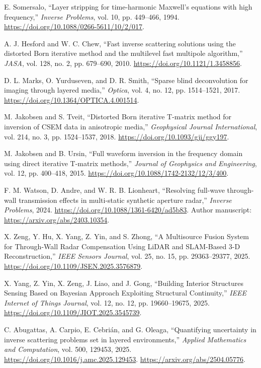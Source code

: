  E. Somersalo, ``Layer stripping for time-harmonic Maxwell's equations with high frequency,'' \emph{Inverse Problems}, vol. 10, pp. 449--466, 1994. \url{https://doi.org/10.1088/0266-5611/10/2/017}.

 A. J. Hesford and W. C. Chew, ``Fast inverse scattering solutions using the distorted Born iterative method and the multilevel fast multipole algorithm,'' \emph{JASA}, vol. 128, no. 2, pp. 679--690, 2010. \url{https://doi.org/10.1121/1.3458856}.

 D. L. Marks, O. Yurduseven, and D. R. Smith, ``Sparse blind deconvolution for imaging through layered media,'' \emph{Optica}, vol. 4, no. 12, pp. 1514--1521, 2017. \url{https://doi.org/10.1364/OPTICA.4.001514}.

 M. Jakobsen and S. Tveit, ``Distorted Born iterative T-matrix method for inversion of CSEM data in anisotropic media,'' \emph{Geophysical Journal International}, vol. 214, no. 3, pp. 1524--1537, 2018. \url{https://doi.org/10.1093/gji/ggy197}.

 M. Jakobsen and B. Ursin, ``Full waveform inversion in the frequency domain using direct iterative T-matrix methods,'' \emph{Journal of Geophysics and Engineering}, vol. 12, pp. 400--418, 2015. \url{https://doi.org/10.1088/1742-2132/12/3/400}.

 F. M. Watson, D. Andre, and W. R. B. Lionheart, ``Resolving full-wave through-wall transmission effects in multi-static synthetic aperture radar,'' \emph{Inverse Problems}, 2024. \url{https://doi.org/10.1088/1361-6420/ad5b83}. Author manuscript: \url{https://arxiv.org/abs/2403.10354}.

 X. Zeng, Y. Hu, X. Yang, Z. Yin, and S. Zhong, ``A Multisource Fusion System for Through-Wall Radar Compensation Using LiDAR and SLAM-Based 3-D Reconstruction,'' \emph{IEEE Sensors Journal}, vol. 25, no. 15, pp. 29363--29377, 2025. \url{https://doi.org/10.1109/JSEN.2025.3576879}.

 X. Yang, Z. Yin, X. Zeng, J. Liao, and J. Gong, ``Building Interior Structures Sensing Based on Bayesian Approach Exploiting Structural Continuity,'' \emph{IEEE Internet of Things Journal}, vol. 12, no. 12, pp. 19660--19675, 2025. \url{https://doi.org/10.1109/JIOT.2025.3545739}.

 C. Abugattas, A. Carpio, E. Cebrián, and G. Oleaga, ``Quantifying uncertainty in inverse scattering problems set in layered environments,'' \emph{Applied Mathematics and Computation}, vol. 500, 129453, 2025. \url{https://doi.org/10.1016/j.amc.2025.129453}. \url{https://arxiv.org/abs/2504.05776}.

